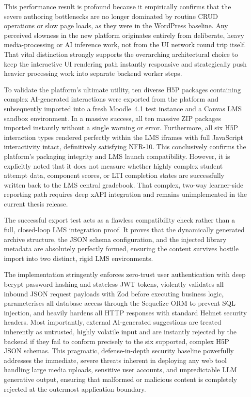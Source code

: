This performance result is profound because it empirically confirms that the severe authoring bottlenecks are no longer dominated by routine CRUD operations or slow page loads, as they were in the WordPress baseline. Any perceived slowness in the new platform originates entirely from deliberate, heavy media-processing or AI inference work, not from the UI network round trip itself. That vital distinction strongly supports the overarching architectural choice to keep the interactive UI rendering path instantly responsive and strategically push heavier processing work into separate backend worker steps.

To validate the platform's ultimate utility, ten diverse H5P packages containing complex AI-generated interactions were exported from the platform and subsequently imported into a fresh Moodle~4.1 test instance and a Canvas LMS sandbox environment. In a massive success, all ten massive ZIP packages imported instantly without a single warning or error. Furthermore, all six H5P interaction types rendered perfectly within the LMS iframes with full JavaScript interactivity intact, definitively satisfying NFR-10. This conclusively confirms the platform's packaging integrity and LMS launch compatibility. However, it is explicitly noted that it does not measure whether highly complex student attempt data, component scores, or LTI completion states are successfully written back to the LMS central gradebook. That complex, two-way learner-side reporting path requires deep xAPI integration and remains unimplemented in the current thesis release.

The successful export test acts as a flawless compatibility check rather than a full, closed-loop LMS integration proof. It proves that the dynamically generated archive structure, the JSON schema configuration, and the injected library metadata are absolutely perfectly formed, ensuring the content survives hostile import into two distinct, rigid LMS environments. 

The implementation stringently enforces zero-trust user authentication with deep bcrypt password hashing and stateless JWT tokens, violently validates all inbound JSON request payloads with Zod before executing business logic, parameterises all database access through the Sequelize ORM to prevent SQL injection, and heavily hardens all HTTP responses with standard Helmet security headers. Most importantly, external AI-generated suggestions are treated inherently as untrusted, highly volatile input and are instantly rejected by the backend if they fail to conform precisely to the six supported, complex H5P JSON schemas. This pragmatic, defense-in-depth security baseline powerfully addresses the immediate, severe threats inherent in deploying any web tool handling large media uploads, sensitive user accounts, and unpredictable LLM generative output, ensuring that malformed or malicious content is completely rejected at the outermost application boundary.

